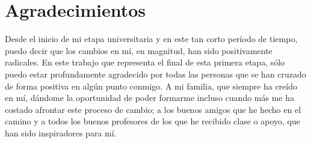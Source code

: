 \noindent \textbf{}

\chapter*{Agradecimientos}
\thispagestyle{empty}
\vspace{1cm}


Desde el inicio de mi etapa universitaria y en este tan corto período de tiempo, puedo decir que los cambios en mí, en magnitud, han sido positivamente radicales. En este trabajo que representa el final de esta primera etapa, sólo puedo estar profundamente agradecido por todas las personas que se han cruzado de forma positiva en algún punto conmigo. A mi familia, que siempre ha creído en mí, dándome la oportunidad de poder formarme incluso cuando más me ha costado afrontar este proceso de cambio; a los buenos amigos que he hecho en el camino y a todos los buenos profesores de los que he recibido clase o apoyo, que han sido inspiradores para mí.

